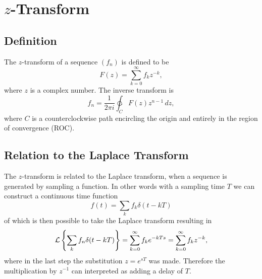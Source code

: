
\section{\(z\)-Transform}

\subsection{Definition}

The \(z\)-transform of a sequence \((f_n)\) is defined to be
\[
	F(z) = \sum_{k = 0}^\infty f_k z^{-k},
\]
where \(z\) is a complex number. The inverse transform is
\[
	f_n = \frac{1}{2\pi i} \ointctrclockwise_C F(z) z^{n-1} \, dz,
\]
where \(C\) is a counterclockwise path encircling the origin and entirely in the region of convergence (ROC).

\subsection{Relation to the Laplace Transform}

The \(z\)-transform is related to the Laplace transform, when a sequence is generated by sampling a function. In other words with a sampling time \(T\) we can construct a continuous time function
\[
	f(t) = \sum_k f_k \delta(t - kT)
\]
of which is then possible to take the Laplace transform resulting in
\[
	\operatorname{\mathcal{L}} \left\{ \sum_k f_n \delta(t - kT) \right\}
	= \sum_{k=0}^\infty f_k e^{-kTs}
	= \sum_{k=0}^\infty f_k z^{-k},
\]
where in the last step the substitution \(z = e^{sT}\) was made. Therefore the multiplication by \(z^{-1}\) can interpreted as adding a delay of \(T\).

